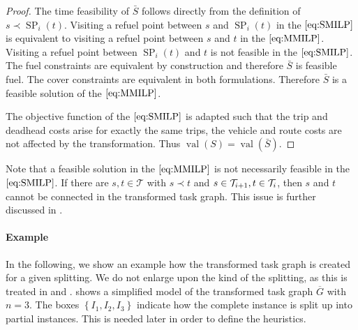 \begin{proof}
The time feasibility of $\bar{S}$ follows directly from the definition of ${s\prec\operatorname{SP}_i(t)}$. Visiting a refuel point between $s$ and $\operatorname{SP}_i(t)$ in the $\eqref{eq:SMILP}$ is equivalent to visiting a refuel point between $s$ and $t$ in the $\eqref{eq:MMILP}$. Visiting a refuel point between $\operatorname{SP}_i(t)$ and $t$ is not feasible in the $\eqref{eq:SMILP}$. The fuel constraints are equivalent by construction and therefore $\bar{S}$ is feasible \wrt fuel. The cover constraints are equivalent in both formulations. Therefore $\bar{S}$ is a feasible solution of the $\eqref{eq:MMILP}$.

The objective function of the $\eqref{eq:SMILP}$ is adapted such that the trip and deadhead costs arise for exactly the same trips, the vehicle and route costs are not affected by the transformation. Thus ${\operatorname{val}(S)=\operatorname{val}(\bar{S})}$.
%
\end{proof}

\begin{remark}

Note that a feasible solution in the $\eqref{eq:MMILP}$ is not necessarily feasible in the $\eqref{eq:SMILP}$. If there are ${s,t\in\mathcal{T}}$ with ${s\prec t}$ and ${s\in\mathcal{T}_{i+1}}, {t\in\mathcal{T}_i}$, then $s$ and $t$ cannot be connected in the transformed task graph. This issue is further discussed in .

\end{remark}

\paragraph{Example} \parfill

In the following, we show an example how the transformed task graph is created for a given splitting. We do not enlarge upon the kind of the splitting, as this is treated in  and .  shows a simplified model of the transformed task graph $\overline{G}$ with $n=3$. The boxes $\left\{I_1,I_2,I_3\right\}$ indicate how the complete instance is split up into partial instances. This is needed later in order to define the heuristics.

